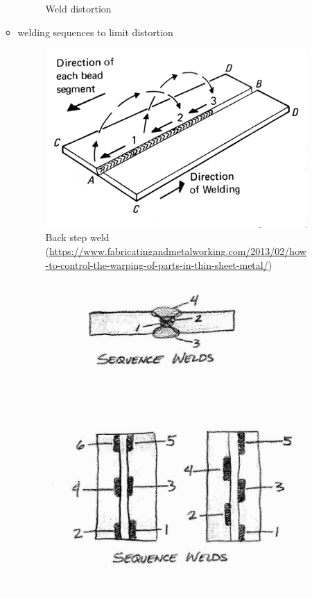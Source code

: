 \begin{itemize}
\begin{itemize}
\begin{figure}[H]
\caption{Weld distortion \citep{Hetnarski2014}}
\end{figure}
\item welding sequences to limit distortion
\begin{figure}[H]
\centering
\includegraphics[width=12cm]{PIC/CH07/WSSS}
\caption{Back step weld (\href{https://www.fabricatingandmetalworking.com/2013/02/how-to-control-the-warping-of-parts-in-thin-sheet-metal/}{\url{https://www.fabricatingandmetalworking.com/2013/02/how-to-control-the-warping-of-parts-in-thin-sheet-metal/}})}
\end{figure}
\begin{figure}[H]
\centering
\includegraphics[height=12cm]{PIC/CH07/WSSSS}

\end{figure}
\end{itemize}
\end{itemize}
